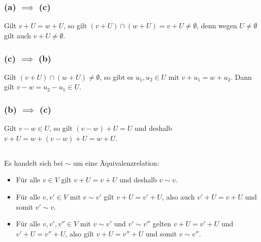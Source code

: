 \section{}





\subsection{}

\subsubsection*{(a) $\implies$ (c)}
Gilt $v + U = w + U$, so gilt $(v + U) \cap (w + U) = v + U \neq \emptyset$, denn wegen $U \neq \emptyset$ gilt auch $v + U \neq \emptyset$.

\subsubsection*{(c) $\implies$ (b)}
Gilt $(v + U) \cap (w + U) \neq \emptyset$, so gibt es $u_1, u_2 \in U$ mit $v + u_1 = w + u_2$.
Dann gilt $v - w = u_2 - u_1 \in U$.

\subsubsection*{(b) $\implies$ (c)}
Gilt $v - w \in U$, so gilt $(v - w) + U = U$ und deshalb $v + U = w + (v-w) + U = w + U$.





\subsection{}

Es handelt sich bei $\sim$ um eine Äquivalenzrelation:

\begin{itemize}
  \item
    Für alle $v \in V$ gilt $v + U = v + U$ und deshalb $v \sim v$.
  \item
    Für alle $v, v' \in V$ mit $v \sim v'$ gilt $v + U = v' + U$, also auch $v' + U = v + U$ und somit $v' \sim v$.
  \item
    Für alle $v, v', v'' \in V$ mit $v \sim v'$ und $v' \sim v''$ gelten $v + U = v' + U$ und $v' + U = v'' + U$, also gilt $v + U = v'' + U$ und somit $v \sim v''$.
\end{itemize}


